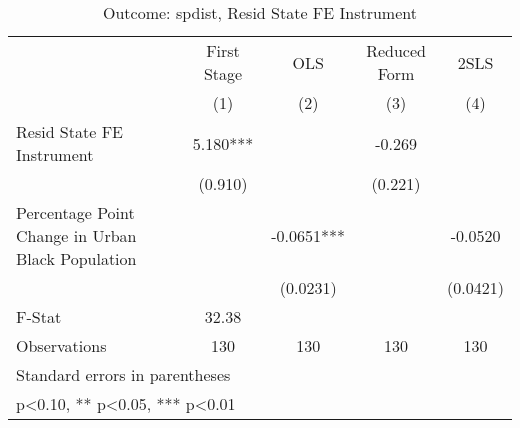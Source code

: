 \begin{table}[htbp]\centering
\def\sym#1{\ifmmode^{#1}\else\(^{#1}\)\fi}
\caption{Outcome: spdist, Resid State FE Instrument}
\begin{tabular}{l*{4}{c}}
\toprule
                    & First Stage   &         OLS   &Reduced Form   &        2SLS   \\
                    &\multicolumn{1}{c}{(1)}   &\multicolumn{1}{c}{(2)}   &\multicolumn{1}{c}{(3)}   &\multicolumn{1}{c}{(4)}   \\
\midrule
Resid State FE Instrument&       5.180***&               &      -0.269   &               \\
                    &     (0.910)   &               &     (0.221)   &               \\
\addlinespace
Percentage Point Change in Urban Black Population&               &     -0.0651***&               &     -0.0520   \\
                    &               &    (0.0231)   &               &    (0.0421)   \\
\midrule
F-Stat              &       32.38   &               &               &               \\
Observations        &         130   &         130   &         130   &         130   \\
\bottomrule
\multicolumn{5}{l}{\footnotesize Standard errors in parentheses}\\
\multicolumn{5}{l}{\footnotesize * p<0.10, ** p<0.05, *** p<0.01}\\
\end{tabular}
\end{table}
